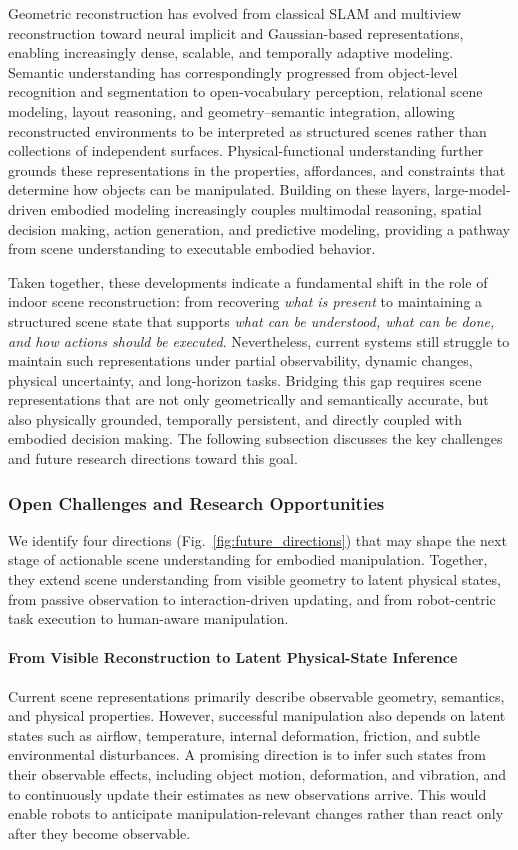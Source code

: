 \documentclass{SCIS2026}
\begin{document}
Geometric reconstruction has evolved from classical SLAM and multiview reconstruction toward neural implicit and Gaussian-based representations, enabling increasingly dense, scalable, and temporally adaptive modeling. Semantic understanding has correspondingly progressed from object-level recognition and segmentation to open-vocabulary perception, relational scene modeling, layout reasoning, and geometry--semantic integration, allowing reconstructed environments to be interpreted as structured scenes rather than collections of independent surfaces. Physical-functional understanding further grounds these representations in the properties, affordances, and constraints that determine how objects can be manipulated. Building on these layers, large-model-driven embodied modeling increasingly couples multimodal reasoning, spatial decision making, action generation, and predictive modeling, providing a pathway from scene understanding to executable embodied behavior.

Taken together, these developments indicate a fundamental shift in the role of indoor scene reconstruction: from recovering \emph{what is present} to maintaining a structured scene state that supports \emph{what can be understood, what can be done, and how actions should be executed}. Nevertheless, current systems still struggle to maintain such representations under partial observability, dynamic changes, physical uncertainty, and long-horizon tasks. Bridging this gap requires scene representations that are not only geometrically and semantically accurate, but also physically grounded, temporally persistent, and directly coupled with embodied decision making. The following subsection discusses the key challenges and future research directions toward this goal.

\subsubsection{Open Challenges and Research Opportunities}

We identify four directions (Fig.~\ref{fig:future_directions}) that may shape the next stage of actionable scene understanding for embodied manipulation. Together, they extend scene understanding from visible geometry to latent physical states, from passive observation to interaction-driven updating, and from robot-centric task execution to human-aware manipulation.

\paragraph{From Visible Reconstruction to Latent Physical-State Inference}
Current scene representations primarily describe observable geometry, semantics, and physical properties. However, successful manipulation also depends on latent states such as airflow, temperature, internal deformation, friction, and subtle environmental disturbances. A promising direction is to infer such states from their observable effects, including object motion, deformation, and vibration, and to continuously update their estimates as new observations arrive. This would enable robots to anticipate manipulation-relevant changes rather than react only after they become observable.
\end{document}
